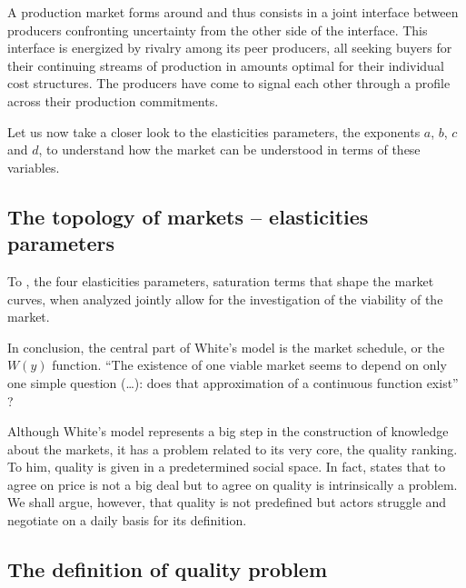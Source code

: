 \documentclass[a4paper, 12pt, openright, oneside, german, french, brazil, english, article]{abntex2}
\begin{document}
	\begin{citacao}
		A production market forms around and thus consists in a joint interface between producers confronting uncertainty from the other side of the interface. This interface is energized by rivalry among its peer producers, all seeking buyers for their continuing streams of production in amounts optimal for their individual cost structures. The producers have come to signal each other through a profile across their production commitments. \cite[p. 27]{white2002markets}
	\end{citacao}
	
	Let us now take a closer look to the elasticities parameters, the exponents $a$, $b$, $c$ and $d$, to understand how the market can be understood in terms of these variables.
	
	\subsection{The topology of markets -- elasticities parameters}
	
	To , the four elasticities parameters, saturation terms that shape the market curves, when analyzed jointly allow for the investigation of the viability of the market. 
		
	
	
	
	
	
	
	
	
	
	
	
	In conclusion, the central part of White's model is the market schedule, or the $W(y)$ function. ``The existence of one viable market seems to depend on only one simple question (\dots): does that approximation of a continuous function exist'' \cite[p. 219]{favereau2002markets}? 
	
	Although White's model represents a big step in the construction of knowledge about the markets, it has a problem related to its very core, the quality ranking. To him, quality is given in a predetermined social space. In fact,  states that to agree on price is not a big deal but to agree on quality is intrinsically a problem. We shall argue, however, that quality is not predefined but actors struggle and negotiate on a daily basis for its definition. 
	
	\subsection{The definition of quality problem}
	
\end{document}
